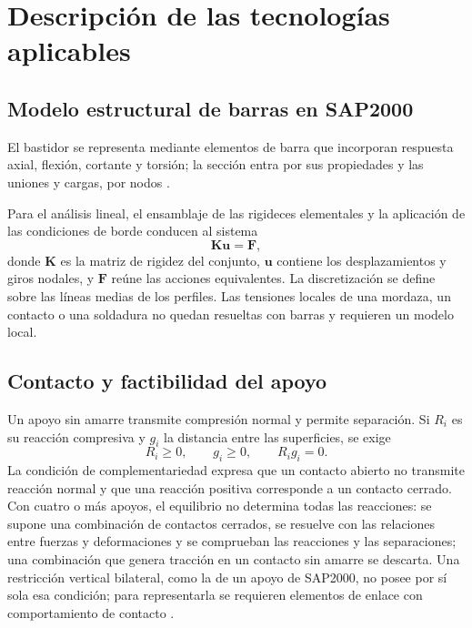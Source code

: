 \section{Descripción de las tecnologías aplicables}

\subsection{Modelo estructural de barras en SAP2000}
\label{sec:sap_barras_revision}

El bastidor se representa mediante elementos de barra que incorporan respuesta axial, flexión, cortante y torsión; la sección entra por sus propiedades y las uniones y cargas, por nodos \cite{csi_analisis_2016}.

Para el análisis lineal, el ensamblaje de las rigideces elementales y la aplicación de las condiciones de borde conducen al sistema
\begin{equation}
\mathbf{K}\mathbf{u}=\mathbf{F},
\label{eq:kuf_revision}
\end{equation}
donde $\mathbf{K}$ es la matriz de rigidez del conjunto, $\mathbf{u}$ contiene los desplazamientos y giros nodales, y $\mathbf{F}$ reúne las acciones equivalentes. La discretización se define sobre las líneas medias de los perfiles. Las tensiones locales de una mordaza, un contacto o una soldadura no quedan resueltas con barras y requieren un modelo local.

\subsection{Contacto y factibilidad del apoyo}
\label{sec:contacto_revision}

Un apoyo sin amarre transmite compresión normal y permite separación. Si $R_i$ es su reacción compresiva y $g_i$ la distancia entre las superficies, se exige
\begin{equation}
R_i\geq0,\qquad g_i\geq0,\qquad R_i g_i=0.
\label{eq:complementariedad_revision}
\end{equation}
La condición de complementariedad expresa que un contacto abierto no transmite reacción normal y que una reacción positiva corresponde a un contacto cerrado. Con cuatro o más apoyos, el equilibrio no determina todas las reacciones: se supone una combinación de contactos cerrados, se resuelve con las relaciones entre fuerzas y deformaciones y se comprueban las reacciones y las separaciones; una combinación que genera tracción en un contacto sin amarre se descarta. Una restricción vertical bilateral, como la de un apoyo de SAP2000, no posee por sí sola esa condición; para representarla se requieren elementos de enlace con comportamiento de contacto \cite{csi_analisis_2016}.

